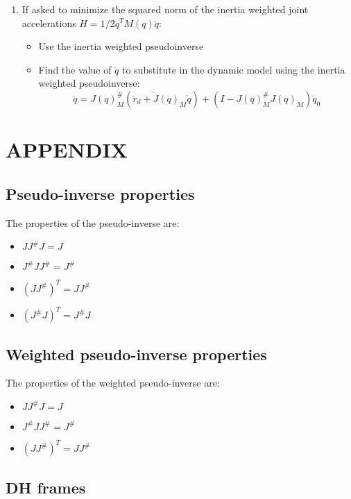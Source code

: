 \documentclass[a4paper,12pt]{article}
\begin{document}
\begin{enumerate}
\begin{itemize}
    \end{itemize}
    \item If asked to minimize the squared norm of 
    the inertia weighted 
    joint accelerations $H=1/2\ddot{q}^TM(q)\ddot{q}$:
    \begin{itemize}
        \item Use the inertia weighted pseudoinverse
        \item Find the value of $\ddot{q}$ to substitute 
        in the dynamic model using the inertia weighted pseudoinverse:
        \begin{equation}
            \ddot{q} = J(q)_M^{\#}(\ddot{r}_d + \dot{J}(q)_M\dot{q})+ (I-J(q)^{\#}_MJ(q)_M)\ddot{q}_0
            \end{equation}
    \end{itemize}
\end{enumerate}





\section{APPENDIX}
\subsection{Pseudo-inverse properties}\label{sec:Pseudo-inverse properties}
The properties of the pseudo-inverse are:
\begin{itemize}
    \item $J J^\# J = J$
    \item $J^\# J J^\# = J^\#$
    \item $(J J^\#)^T = J J^\#$
    \item $(J^\# J)^T = J^\# J$
\end{itemize}
\subsection{Weighted pseudo-inverse properties}
The properties of the weighted pseudo-inverse are:
\begin{itemize}
    \item $J J^\# J = J$
    \item $J^\# J J^\# = J^\#$
    \item $(J J^\#)^T = J J^\#$
\end{itemize}
\subsection{DH frames}
\end{document}
